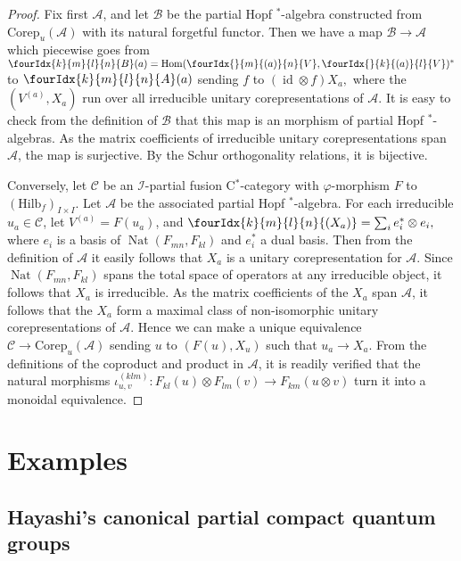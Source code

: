 \documentclass[10pt]{article}
\DeclareMathOperator{\id}{id}
\DeclareMathOperator{\Hom}{Hom}
\DeclareMathOperator{\Nat}{\mathrm{Nat}}
\newcommand{\Corep}{\mathrm{Corep}}
\newcommand{\CatCC}{\mathscr{C}}
\newcommand{\Hilb}{\mathrm{Hilb}}
\newcommand{\Gr}[5]{\fourIdx{#2}{#4}{#3}{#5}{#1}}%
\theoremstyle{definition}
\numberwithin{equation}{section}
\begin{document}
\begin{proof} Fix first $\mathscr{A}$, and let $\mathscr{B}$ be the partial Hopf $^*$-algebra constructed from $\Corep_u(\mathscr{A})$ with its natural forgetful functor. Then we have a map $\mathscr{B} \rightarrow \mathscr{A}$ which piecewise goes from $\Gr{B}{k}{l}{m}{n}(a) = \Hom(\Gr{V}{}{(a)}{m}{n},\Gr{V}{}{(a)}{k}{l})^*$ to $\Gr{A}{k}{l}{m}{n}(a)$ sending $f$ to $(\id\otimes f)X_a,$ where the $(V^{(a)},X_a)$ run over all irreducible unitary corepresentations of $\mathscr{A}$. It is easy to check from the definition of $\mathscr{B}$ that this map is an morphism of partial Hopf $^*$-algebras. As the matrix coefficients of irreducible unitary corepresentations span $\mathscr{A}$, the map is surjective. By the Schur orthogonality relations, it is bijective.

Conversely, let $\CatCC$ be an $\mathscr{I}$-partial fusion C$^*$-category with $\varphi$-morphism $F$ to $(\Hilb_f)_{I\times I}$. Let $\mathscr{A}$ be the associated partial Hopf $^*$-algebra. For each irreducible $u_a \in \CatCC$, let $V^{(a)} = F(u_a)$, and $\Gr{(X_a)}{k}{l}{m}{n} = \sum_i e_i^*\otimes e_i,$ where $e_i$ is a basis of $\Nat(F_{mn},F_{kl})$ and $e_i^*$ a dual basis. Then from the definition of $\mathscr{A}$ it easily follows that $X_a$ is a unitary corepresentation for $\mathscr{A}$. Since $\Nat(F_{mn},F_{kl})$ spans the total space of operators at any irreducible object, it follows that $X_a$ is irreducible. As the matrix coefficients of the $X_a$ span $\mathscr{A}$, it follows that the $X_a$ form a maximal class of non-isomorphic unitary corepresentations of $\mathscr{A}$. Hence we can make a unique equivalence $\CatCC\rightarrow \Corep_u(\mathscr{A})$ sending $u$ to $(F(u),X_u)$ such that $u_a\rightarrow X_a$. From the definitions of the coproduct and product in $\mathscr{A}$, it is readily verified that the natural morphisms $\iota^{(klm)}_{u,v}:F_{kl}(u)\otimes F_{lm}(v)\rightarrow F_{km}(u\otimes v)$ turn it into a monoidal equivalence. 
\end{proof}


\section{Examples}

\subsection{Hayashi's canonical partial compact quantum groups} \label{SubSecCan}
\end{document}
